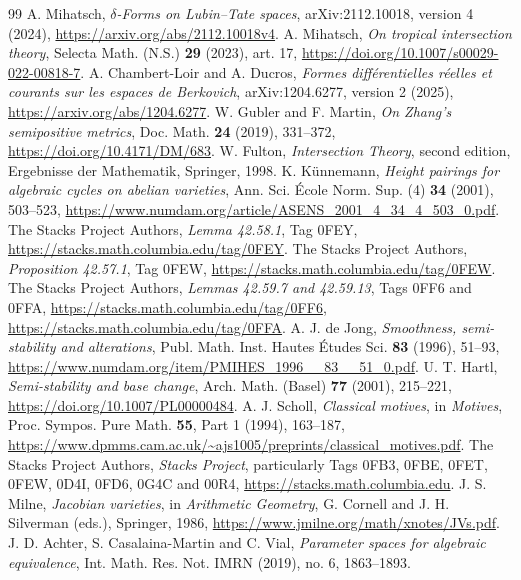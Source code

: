 \documentclass[11pt]{article}
\theoremstyle{definition}
\theoremstyle{remark}
\numberwithin{equation}{section}
\begin{document}
\begin{thebibliography}{99}
 A. Mihatsch, \emph{$\delta$-Forms on Lubin--Tate spaces}, arXiv:2112.10018, version 4 (2024), \url{https://arxiv.org/abs/2112.10018v4}.
 A. Mihatsch, \emph{On tropical intersection theory}, Selecta Math. (N.S.) \textbf{29} (2023), art. 17, \url{https://doi.org/10.1007/s00029-022-00818-7}.
 A. Chambert-Loir and A. Ducros, \emph{Formes diff\'erentielles r\'eelles et courants sur les espaces de Berkovich}, arXiv:1204.6277, version 2 (2025), \url{https://arxiv.org/abs/1204.6277}.
 W. Gubler and F. Martin, \emph{On Zhang's semipositive metrics}, Doc. Math. \textbf{24} (2019), 331--372, \url{https://doi.org/10.4171/DM/683}.
 W. Fulton, \emph{Intersection Theory}, second edition, Ergebnisse der Mathematik, Springer, 1998.
 K. K\"unnemann, \emph{Height pairings for algebraic cycles on abelian varieties}, Ann. Sci. \'Ecole Norm. Sup. (4) \textbf{34} (2001), 503--523, \url{https://www.numdam.org/article/ASENS_2001_4_34_4_503_0.pdf}.
 The Stacks Project Authors, \emph{Lemma 42.58.1}, Tag 0FEY, \url{https://stacks.math.columbia.edu/tag/0FEY}.
 The Stacks Project Authors, \emph{Proposition 42.57.1}, Tag 0FEW, \url{https://stacks.math.columbia.edu/tag/0FEW}.
 The Stacks Project Authors, \emph{Lemmas 42.59.7 and 42.59.13}, Tags 0FF6 and 0FFA, \url{https://stacks.math.columbia.edu/tag/0FF6}, \url{https://stacks.math.columbia.edu/tag/0FFA}.
 A. J. de Jong, \emph{Smoothness, semi-stability and alterations}, Publ. Math. Inst. Hautes \'Etudes Sci. \textbf{83} (1996), 51--93, \url{https://www.numdam.org/item/PMIHES_1996__83__51_0.pdf}.
 U. T. Hartl, \emph{Semi-stability and base change}, Arch. Math. (Basel) \textbf{77} (2001), 215--221, \url{https://doi.org/10.1007/PL00000484}.
 A. J. Scholl, \emph{Classical motives}, in \emph{Motives}, Proc. Sympos. Pure Math. \textbf{55}, Part 1 (1994), 163--187, \url{https://www.dpmms.cam.ac.uk/~ajs1005/preprints/classical_motives.pdf}.
 The Stacks Project Authors, \emph{Stacks Project}, particularly Tags 0FB3, 0FBE, 0FET, 0FEW, 0D4I, 0FD6, 0G4C and 00R4, \url{https://stacks.math.columbia.edu}.
 J. S. Milne, \emph{Jacobian varieties}, in \emph{Arithmetic Geometry}, G. Cornell and J. H. Silverman (eds.), Springer, 1986, \url{https://www.jmilne.org/math/xnotes/JVs.pdf}.
 J. D. Achter, S. Casalaina-Martin and C. Vial, \emph{Parameter spaces for algebraic equivalence}, Int. Math. Res. Not. IMRN (2019), no. 6, 1863--1893.
\end{thebibliography}
\end{document}
